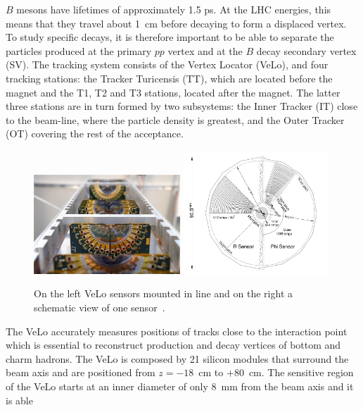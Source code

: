 $B$ mesons have lifetimes of approximately 1.5 ps. At the LHC energies, this means that they travel about
1~cm before decaying to form a displaced vertex. To study specific decays, it is therefore important
to be able to separate the particles produced at the primary $pp$ vertex and at the $B$ decay secondary vertex (SV).
The tracking system consists of the Vertex Locator (VeLo), and four tracking stations:
the Tracker Turicensis (TT), which are located before the magnet and the T1, T2 and T3 stations,
located after the magnet. The latter three stations are in turn formed by two subsystems:
the Inner Tracker (IT) close to the beam-line, where the particle density is greatest, and
the Outer Tracker (OT) covering the rest of the acceptance.
%
\begin{center}
\begin{figure}[h!]
\centering 
\includegraphics[width=0.49\textwidth]{Detector/figs/detector/VELO.png}
\includegraphics[width=0.49\textwidth]{Detector/figs/detector/VELO_scheme.png}
\caption{On the left VeLo sensors mounted in line and on the right a schematic view of one sensor~\cite{Alves:2008zz}.}
\label{VeLo}
\end{figure}
\end{center}
%
The VeLo accurately measures positions of tracks close to the interaction point which is essential to reconstruct
 production and decay vertices of bottom and charm hadrons. The VeLo is composed by 21
silicon modules that surround the beam axis and are positioned from $z = -18$~cm to $+80$~cm.
The sensitive region of the VeLo starts at an inner diameter of only 8~mm from the beam axis and it is able
